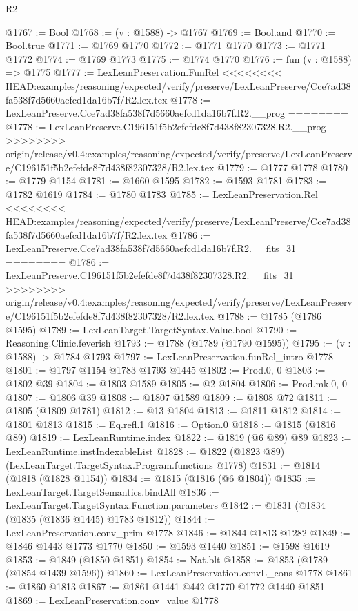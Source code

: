 \begin{lexlean}{R2}
\begin{coremodule}
{{{{{{{{{{{{{{{{{{{{{{{{{{{{{{{{{{{{{{{{{{{{{{{{{{{{{{{{{{{{{{{{{{{{{{{{{{{{{{{{{{{{{{{{{{{{@1767 := Bool
@1768 := (v : @1588) -> @1767
@1769 := Bool.and
@1770 := Bool.true
@1771 := @1769 @1770
@1772 := @1771 @1770
@1773 := @1771 @1772
@1774 := @1769 @1773
@1775 := @1774 @1770
@1776 := fun (v : @1588) => @1775
@1777 := LexLeanPreservation.FunRel
<<<<<<<< HEAD:examples/reasoning/expected/verify/preserve/LexLeanPreserve/Cce7ad38fa538f7d5660aefcd1da16b7f/R2.lex.tex
@1778 := LexLeanPreserve.Cce7ad38fa538f7d5660aefcd1da16b7f.R2.__prog
========
@1778 := LexLeanPreserve.C196151f5b2efefde8f7d438f82307328.R2.__prog
>>>>>>>> origin/release/v0.4:examples/reasoning/expected/verify/preserve/LexLeanPreserve/C196151f5b2efefde8f7d438f82307328/R2.lex.tex
@1779 := @1777 @1778
@1780 := @1779 @1154
@1781 := @1660 @1595
@1782 := @1593 @1781
@1783 := @1782 @1619
@1784 := @1780 @1783
@1785 := LexLeanPreservation.Rel
<<<<<<<< HEAD:examples/reasoning/expected/verify/preserve/LexLeanPreserve/Cce7ad38fa538f7d5660aefcd1da16b7f/R2.lex.tex
@1786 := LexLeanPreserve.Cce7ad38fa538f7d5660aefcd1da16b7f.R2.__fits_31
========
@1786 := LexLeanPreserve.C196151f5b2efefde8f7d438f82307328.R2.__fits_31
>>>>>>>> origin/release/v0.4:examples/reasoning/expected/verify/preserve/LexLeanPreserve/C196151f5b2efefde8f7d438f82307328/R2.lex.tex
@1788 := @1785 (@1786 @1595)
@1789 := LexLeanTarget.TargetSyntax.Value.bool
@1790 := Reasoning.Clinic.feverish
@1793 := @1788 (@1789 (@1790 @1595))
@1795 := (v : @1588) -> @1784 @1793
@1797 := LexLeanPreservation.funRel_intro @1778
@1801 := @1797 @1154 @1783 @1793 @1445
@1802 := Prod.{0, 0}
@1803 := @1802 @39
@1804 := @1803 @1589
@1805 := @2 @1804
@1806 := Prod.mk.{0, 0}
@1807 := @1806 @39
@1808 := @1807 @1589
@1809 := @1808 @72
@1811 := @1805 (@1809 @1781)
@1812 := @13 @1804
@1813 := @1811 @1812
@1814 := @1801 @1813
@1815 := Eq.refl.{1}
@1816 := Option.{0}
@1818 := @1815 (@1816 @89)
@1819 := LexLeanRuntime.index
@1822 := @1819 (@6 @89) @89
@1823 := LexLeanRuntime.instIndexableList
@1828 := @1822 (@1823 @89) (LexLeanTarget.TargetSyntax.Program.functions @1778)
@1831 := @1814 (@1818 (@1828 @1154))
@1834 := @1815 (@1816 (@6 @1804))
@1835 := LexLeanTarget.TargetSemantics.bindAll
@1836 := LexLeanTarget.TargetSyntax.Function.parameters
@1842 := @1831 (@1834 (@1835 (@1836 @1445) @1783 @1812))
@1844 := LexLeanPreservation.conv_prim @1778
@1846 := @1844 @1813 @1282
@1849 := @1846 @1443 @1773 @1770
@1850 := @1593 @1440
@1851 := @1598 @1619
@1853 := @1849 (@1850 @1851)
@1854 := Nat.blt
@1858 := @1853 (@1789 (@1854 @1439 @1596))
@1860 := LexLeanPreservation.convL_cons @1778
@1861 := @1860 @1813
@1867 := @1861 @1441 @442 @1770 @1772 @1440 @1851
@1869 := LexLeanPreservation.conv_value @1778
}}}}}}}}}}}}}}}}}}}}}}}}}}}}}}}}}}}}}}}}}}}}}}}}}}}}}}}}}}}}}}}}}}}}}}}}}}}}}}}}}}}}}}}}}}}}
\end{coremodule}
\end{lexlean}

